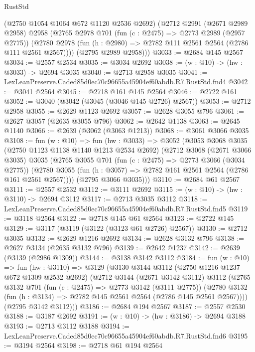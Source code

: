 \begin{lexlean}{RustStd}
\begin{coremodule}
      (@2750 @1054 @1064 @672 @1120 @2536 @2692)
      (@2712
        @2991
        (@2671 @2989 @2958)
        @2958
        (@2765
          @2978
          @701
          (fun (c : @2475) => @2773 @2989 (@2957 @2775))
          (@2780 @2978 (fun (h : @2980) => @2782 @111 @2561 @2564 (@2786 @111 @2561 @2567))))
        (@2795 @2989 @2958)))
@3033 := @2684 @145 @2567
@3034 := @2557 @2534
@3035 := @3034 @2692
@3038 := (w : @10) -> (hw : @3033) -> @2694 @3035
@3040 := @2713 @2958 @3035
@3041 := LexLeanPreserve.Caded85d0ec70c96655a45904ef60abdb.R7.RustStd.fnd4
@3042 := @3041 @2564
@3045 := @2718 @161 @145 @2564
@3046 := @2722 @161
@3052 := @3040 (@3042 (@3045 (@3046 @145 @2726) @2567))
@3053 := @2712 @2958
@3055 := @2629 @1123 @2692
@3057 := @2628 @3055 @796
@3061 := @2627 @3057 (@2635 @3055 @796)
@3062 := @2642 @1138
@3063 := @2645 @1140
@3066 := @2639 (@3062 (@3063 @1213))
@3068 := @3061 @3066 @3035
@3108 := fun (w : @10) =>
  fun (hw : @3033) =>
  @3052
    (@3053
      @3068
      @3035
      (@2750 @1123 @1138 @1140 @1213 @2534 @2692)
      (@2712
        @3068
        (@2671 @3066 @3035)
        @3035
        (@2765
          @3055
          @701
          (fun (c : @2475) => @2773 @3066 (@3034 @2775))
          (@2780 @3055 (fun (h : @3057) => @2782 @161 @2561 @2564 (@2786 @161 @2561 @2567))))
        (@2795 @3066 @3035)))
@3110 := @2684 @61 @2567
@3111 := @2557 @2532
@3112 := @3111 @2692
@3115 := (w : @10) -> (hw : @3110) -> @2694 @3112
@3117 := @2713 @3035 @3112
@3118 := LexLeanPreserve.Caded85d0ec70c96655a45904ef60abdb.R7.RustStd.fnd5
@3119 := @3118 @2564
@3122 := @2718 @145 @61 @2564
@3123 := @2722 @145
@3129 := @3117 (@3119 (@3122 (@3123 @61 @2726) @2567))
@3130 := @2712 @3035
@3132 := @2629 @1216 @2692
@3134 := @2628 @3132 @796
@3138 := @2627 @3134 (@2635 @3132 @796)
@3139 := @2642 @1237
@3142 := @2639 (@3139 (@2986 @1309))
@3144 := @3138 @3142 @3112
@3184 := fun (w : @10) =>
  fun (hw : @3110) =>
  @3129
    (@3130
      @3144
      @3112
      (@2750 @1216 @1237 @672 @1309 @2532 @2692)
      (@2712
        @3144
        (@2671 @3142 @3112)
        @3112
        (@2765
          @3132
          @701
          (fun (c : @2475) => @2773 @3142 (@3111 @2775))
          (@2780 @3132 (fun (h : @3134) => @2782 @145 @2561 @2564 (@2786 @145 @2561 @2567))))
        (@2795 @3142 @3112)))
@3186 := @2684 @194 @2567
@3187 := @2557 @2530
@3188 := @3187 @2692
@3191 := (w : @10) -> (hw : @3186) -> @2694 @3188
@3193 := @2713 @3112 @3188
@3194 := LexLeanPreserve.Caded85d0ec70c96655a45904ef60abdb.R7.RustStd.fnd6
@3195 := @3194 @2564
@3198 := @2718 @61 @194 @2564

\end{coremodule}
\end{lexlean}
